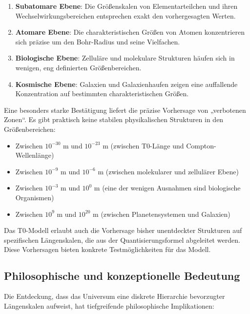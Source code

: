 \documentclass[12pt,a4paper]{article}
\begin{document}
	\begin{enumerate}
		\item \textbf{Subatomare Ebene}: Die Größenskalen von Elementarteilchen und ihren Wechselwirkungsbereichen entsprechen exakt den vorhergesagten Werten.
		
		\item \textbf{Atomare Ebene}: Die charakteristischen Größen von Atomen konzentrieren sich präzise um den Bohr-Radius und seine Vielfachen.
		
		\item \textbf{Biologische Ebene}: Zelluläre und molekulare Strukturen häufen sich in wenigen, eng definierten Größenbereichen.
		
		\item \textbf{Kosmische Ebene}: Galaxien und Galaxienhaufen zeigen eine auffallende Konzentration auf bestimmten charakteristischen Größen.
	\end{enumerate}
	
	Eine besonders starke Bestätigung liefert die präzise Vorhersage von „verbotenen Zonen“. Es gibt praktisch keine stabilen physikalischen Strukturen in den Größenbereichen:
	
	\begin{itemize}
		\item Zwischen $10^{-30}$ m und $10^{-23}$ m (zwischen T0-Länge und Compton-Wellenlänge)
		\item Zwischen $10^{-9}$ m und $10^{-6}$ m (zwischen molekularer und zellulärer Ebene)
		\item Zwischen $10^{-3}$ m und $10^{0}$ m (eine der wenigen Ausnahmen sind biologische Organismen)
		\item Zwischen $10^{9}$ m und $10^{20}$ m (zwischen Planetensystemen und Galaxien)
	\end{itemize}
	
	Das T0-Modell erlaubt auch die Vorhersage bisher unentdeckter Strukturen auf spezifischen Längenskalen, die aus der Quantisierungsformel abgeleitet werden. Diese Vorhersagen bieten konkrete Testmöglichkeiten für das Modell.
	
	\subsection{Philosophische und konzeptionelle Bedeutung}
	
	Die Entdeckung, dass das Universum eine diskrete Hierarchie bevorzugter Längenskalen aufweist, hat tiefgreifende philosophische Implikationen:
	
\end{document}
